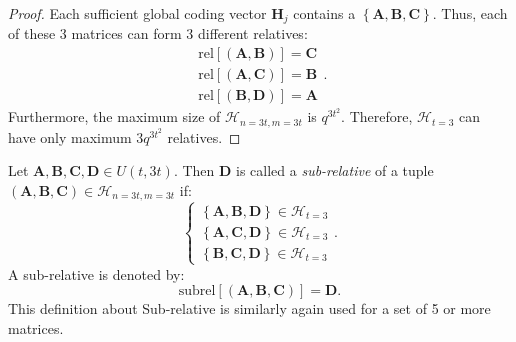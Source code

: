 \begin{proof}
Each sufficient global coding vector $\boldsymbol{H}_{j}$ contains
a $\left\{ \boldsymbol{A},\boldsymbol{B},\boldsymbol{C}\right\} $.
Thus, each of these 3 matrices can form 3 different relatives:
\[
\begin{array}{c}
\mathrm{rel}\left[\left(\boldsymbol{A},\boldsymbol{B}\right)\right]=\boldsymbol{C}\\
\mathrm{rel}\left[\left(\boldsymbol{A},\boldsymbol{C}\right)\right]=\boldsymbol{B}\\
\mathrm{rel}\left[\left(\boldsymbol{B},\boldsymbol{D}\right)\right]=\boldsymbol{A}
\end{array}.
\]
Furthermore, the maximum size of $\mathcal{H}_{n=3t,m=3t}$ is $q^{3t^{2}}$.
Therefore, $\mathcal{H}_{t=3}$ can have only maximum $3q^{3t^{2}}$
relatives.
\end{proof}
\begin{defn}
 Let $\boldsymbol{A},\boldsymbol{B},\boldsymbol{C},\boldsymbol{D}\in U(t,3t)$.
Then $\boldsymbol{D}$ is called a \textit{sub-relative} of a tuple
$\left(\boldsymbol{A},\boldsymbol{B},\boldsymbol{C}\right)\in\mathcal{H}_{n=3t,m=3t}$
if:
\[
\left\{ \begin{array}{c}
\left\{ \boldsymbol{A},\boldsymbol{B},\boldsymbol{D}\right\} \in\mathcal{H}_{t=3}\\
\left\{ \boldsymbol{A},\boldsymbol{C},\boldsymbol{D}\right\} \in\mathcal{H}_{t=3}\\
\left\{ \boldsymbol{B},\boldsymbol{C},\boldsymbol{D}\right\} \in\mathcal{H}_{t=3}
\end{array}\right..
\]
A sub-relative is denoted by: 
\[
\mathrm{subrel}\left[\left(\boldsymbol{A},\boldsymbol{B},\boldsymbol{C}\right)\right]=\boldsymbol{D}.
\]
This definition about Sub-relative is similarly again used for a set
of 5 or more matrices.
\end{defn}
